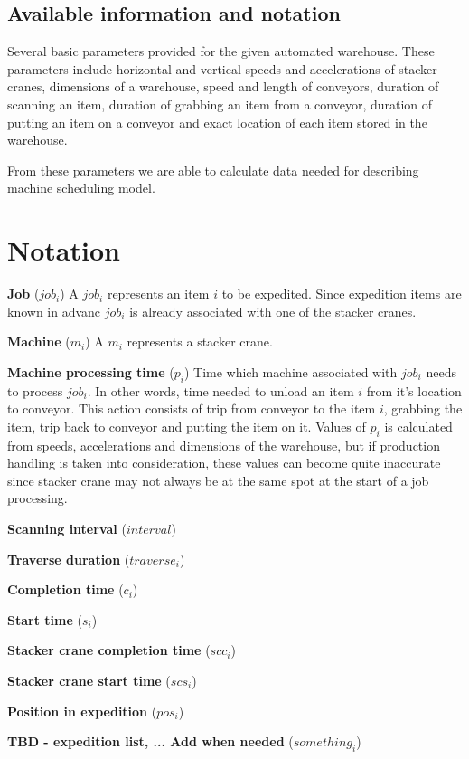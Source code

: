 \documentclass{ctuthesis}
\begin{document}
\subsection{Available information and notation}
Several basic parameters provided for the given automated warehouse. These parameters include horizontal and vertical speeds and accelerations of stacker cranes, dimensions of a warehouse, speed and length of conveyors, duration of scanning an item, duration of grabbing an item from a conveyor, duration of putting an item on a conveyor and exact location of each item stored in the warehouse.

From these parameters we are able to calculate data needed for describing machine scheduling model.
\section{Notation}

\noindent \textbf{Job} ($job_i$) A $job_i$ represents an item $i$ to be expedited. Since expedition items are known in advanc $job_i$ is already associated with one of the stacker cranes. 

\noindent \textbf{Machine} ($m_i$) A $m_i$ represents a stacker crane.

\noindent \textbf{Machine processing time} ($p_i$) Time which machine associated with $job_i$ needs to process $job_i$. In other words, time needed to unload an item $i$ from it's location to conveyor. This action consists of trip from conveyor to the item $i$, grabbing the item, trip back to conveyor and putting the item on it. Values of $p_i$ is calculated from speeds, accelerations and dimensions of the warehouse, but if production handling is taken into consideration, these values can become quite inaccurate since stacker crane may not always be at the same spot at the start of a job processing.

\noindent \textbf{Scanning interval} ($interval$)

\noindent \textbf{Traverse duration} ($traverse_i$)

\noindent \textbf{Completion time} ($c_i$)

\noindent \textbf{Start time} ($s_i$)

\noindent \textbf{Stacker crane completion time} ($scc_i$)

\noindent \textbf{Stacker crane start time} ($scs_i$)

\noindent \textbf{Position in expedition} ($pos_i$)

\noindent \textbf{TBD - expedition list, ... Add when needed} ($something_i$)
\end{document}
